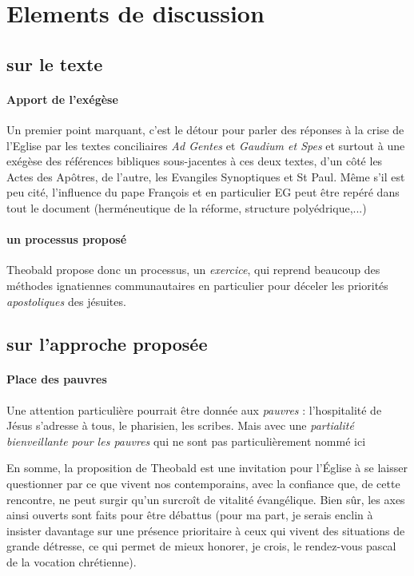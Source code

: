 \section{ Elements de discussion}


\subsection{sur le texte}
\paragraph{Apport de l'exégèse} Un premier point marquant, c'est le détour pour parler des réponses à la crise de l'Eglise par les textes conciliaires \textit{Ad Gentes} et \textit{Gaudium et Spes} et surtout à une exégèse des références bibliques sous-jacentes à ces deux textes, d'un côté les Actes des Apôtres, de l'autre, les Evangiles Synoptiques et St Paul. Même s'il est peu cité, l'influence du pape François et en particulier EG peut être repéré dans tout le document (herméneutique de la réforme, structure polyédrique,...)



\paragraph{un processus proposé} Theobald propose donc un processus, un \textit{exercice}, qui reprend beaucoup des méthodes ignatiennes communautaires en particulier pour déceler les priorités \textit{apostoliques} des jésuites. 



\subsection{sur l'approche proposée}


\paragraph{Place des pauvres} Une attention particulière pourrait être donnée aux \textit{pauvres} : l'hospitalité de Jésus s'adresse à tous, le pharisien, les scribes. Mais avec une \textit{partialité bienveillante pour les pauvres} qui ne sont pas particulièrement nommé ici 
\begin{singlequote}
    En somme, la proposition de Theobald est une invitation pour l’Église à se laisser questionner par ce que vivent nos contemporains, avec la confiance que, de cette rencontre, ne peut surgir qu’un surcroît de vitalité évangélique. Bien sûr, les axes ainsi ouverts sont faits pour être débattus (pour ma part, je serais enclin à insister davantage sur une présence prioritaire à ceux qui vivent des situations de grande détresse, ce qui permet de mieux honorer, je crois, le rendez-vous pascal de la vocation chrétienne).\cite{etienne_grieu_leglise_nodate}

\end{singlequote}

